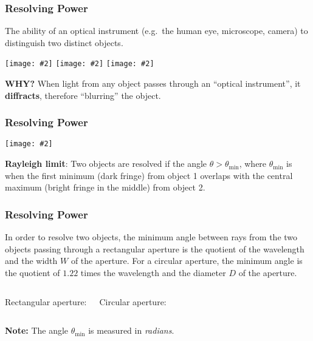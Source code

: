 \documentclass[compress,aspectratio=169]{beamer}
\newcommand{\pic}[2]{\texttt{[image: \#2]}}
\newcommand{\eq}[2]{\vspace{#1}{\LARGE\begin{displaymath}#2\end{displaymath}}}
\begin{document}
\begin{frame}
  \frametitle{Resolving Power}
  The ability of an optical instrument (e.g.\ the human eye, microscope,
  camera) to distinguish two distinct objects.
  \begin{center}
    \pic{.322}{resolve1.png}\hspace{.05in}
    \pic{.322}{resolve2.png}\hspace{.05in}
    \pic{.322}{resolve3.png}\hspace{.05in}
  \end{center}
  \textbf{WHY?} When light from any object passes through an 
  ``optical instrument'', it \textbf{diffracts}, therefore ``blurring'' the
  object.
\end{frame}

\begin{frame}
  \frametitle{Resolving Power}
  \begin{minipage}{.55\textwidth}
      \pic{.95}{resolve4.png}
  \end{minipage}
  \begin{minipage}{.42\textwidth}
    \textbf{Rayleigh limit}: Two objects are resolved if the angle
    $\theta>\theta_\mathrm{min}$, where $\theta_\mathrm{min}$ is when the first
    minimum (dark fringe) from object 1 overlaps with the central maximum
    (bright fringe in the middle) from object 2.
  \end{minipage}
\end{frame}
\begin{frame}
  \frametitle{Resolving Power}
  In order to resolve two objects, the minimum angle between rays from the two
  objects passing through a rectangular aperture is the quotient of the
  wavelength and the width $W$ of the aperture. For a circular aperture, the
  minimum angle is the quotient of $1.22$ times the wavelength and the diameter
  $D$ of the aperture.
  \vspace{.2in}
  \begin{columns}
    Rectangular aperture:

    \eq{-.2in}{
      \boxed{\theta_\mathrm{min}=\frac{\lambda}{W}}
    }
    Circular aperture:

    \eq{-.2in}{
      \boxed{\theta_\mathrm{min}=\frac{1.22\lambda}{D}}
    }
  \end{columns}

  \vspace{.2in}\textbf{Note:} The angle $\theta_\mathrm{min}$ is measured in
  \emph{radians}.
\end{frame}
\end{document}
